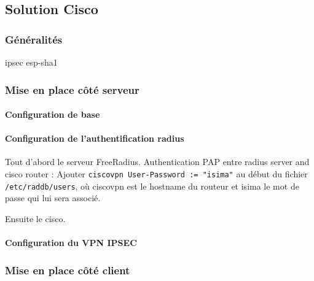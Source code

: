 \subsection{Solution Cisco}

\subsubsection{Généralités}
ipsec esp-sha1

\subsubsection{Mise en place côté serveur}


\paragraph{Configuration de base}


\paragraph{Configuration de l'authentification radius}

Tout d'abord le serveur FreeRadius.
Authentication PAP entre radius server and cisco router :
Ajouter \verb|ciscovpn User-Password := "isima"|  au début du fichier \verb|/etc/raddb/users|, où ciscovpn est le hostname du routeur et isima le mot de passe qui lui sera associé.

Ensuite le cisco.

\paragraph{Configuration du VPN IPSEC}




\subsubsection{Mise en place côté client}


